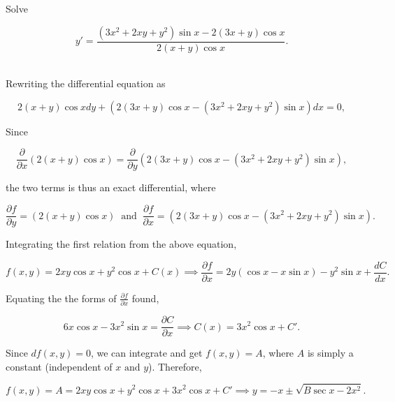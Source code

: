 \documentclass[english,a4paper,12pt]{report}
\begin{document}
{Solve 

\begin{equation}
    y' = \frac{(3x^2+2xy+y^2)\sin x-2(3x+y)\cos x}{2(x+y)\cos x} .
\end{equation}~}
{Rewriting the differential equation as

\begin{equation}
    2(x+y)\cos xdy+(2(3x+y)\cos x-(3x^2+2xy+y^2)\sin x)dx = 0,
\end{equation}

Since

\begin{equation}
    \frac{\partial }{\partial x} (2(x+y)\cos x) = \frac{\partial }{\partial y} (2(3x+y)\cos x-(3x^2+2xy+y^2)\sin x),
\end{equation}

the two terms is thus an exact differential, where

\begin{equation}
    \frac{\partial f}{\partial y} = (2(x+y)\cos x) ~\text { and }~ \frac{\partial f}{\partial x} = (2(3x+y)\cos x-(3x^2+2xy+y^2)\sin x).
\end{equation}

Integrating the first relation from the above equation,

\begin{equation}
    f(x,y) = 2xy\cos x + y^2\cos x + C(x) \implies \frac{\partial f}{\partial x} = 2y(\cos x-x\sin x)-y^2\sin x+\frac{dC}{dx} .
\end{equation}

Equating the the forms of \(\displaystyle \frac{\partial f}{\partial x} \) found, 

\begin{equation}
    6x\cos x-3x^2\sin x = \frac{\partial C}{\partial x} \implies C(x) = 3x^2\cos x+ C'.
\end{equation}

Since \(df(x,y) = 0\), we can integrate and get \(f(x,y) = A\), where \(A\) is simply a constant (independent of \(x \text { and } y\)). Therefore, 

\begin{equation}
    f(x,y) = A = 2xy\cos x+y^2\cos x+3x^2\cos x+C' \implies y = -x \pm \sqrt{B \sec x - 2x^2}. 
\end{equation}~
} 
\end{document}
